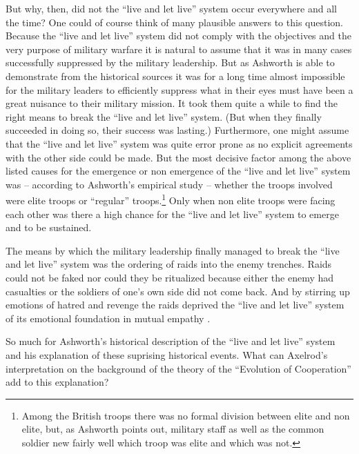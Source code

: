 But why, then, did not the ``live and let live'' system occur everywhere and
all the time? One could of course think of many plausible answers to this
question. Because the ``live and let live'' system did not comply with the objectives
and the very purpose of military warfare it is natural to assume that it was
in many cases successfully suppressed by the military leadership. But as
Ashworth is able to demonstrate from the historical sources it was for a long
time almost impossible for the military leaders to efficiently suppress what
in their eyes must have been a great nuisance to their military mission. It
took them quite a while to find the right means to break the ``live and let
live'' system. (But when they finally succeeded in doing so, their success was
lasting.) Furthermore, one might assume that the ``live and let live'' system
was quite error prone as no explicit agreements with the other side could be
made. But the most decisive factor among the above listed causes for the
emergence or non emergence of the ``live and let live'' system was --
according to Ashworth's empirical study -- whether the troops involved were
elite troops or ``regular'' troops.\footnote{Among the British troops there
  was no formal division between elite and non elite, but, as Ashworth points
  out, military staff as well as the common soldier new fairly well which
  troop was elite and which was not.} Only when non elite troops were facing each
other was there a high chance for the ``live and let live'' system to emerge
and to be sustained.

The means by which the military leadership finally managed to break
the ``live and let live'' system was the ordering of raids into the enemy
trenches. Raids could not be faked nor could they be ritualized because
either the enemy had casualties or the soldiers of one's own side did
not come back. And by stirring up emotions of hatred and revenge the
raids deprived the ``live and let live'' system of its
emotional foundation in mutual empathy \cite[p. 176ff.]{ashworth:1980}.

So much for Ashworth's historical description of the ``live and let
live'' system and his explanation of these suprising historical events.
What can Axelrod's interpretation on the background of the theory of
the ``Evolution of Cooperation'' add to this explanation?

